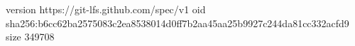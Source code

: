 version https://git-lfs.github.com/spec/v1
oid sha256:b6cc62ba2575083c2ea8538014d0ff7b2aa45aa25b9927c244da81cc332acfd9
size 349708
